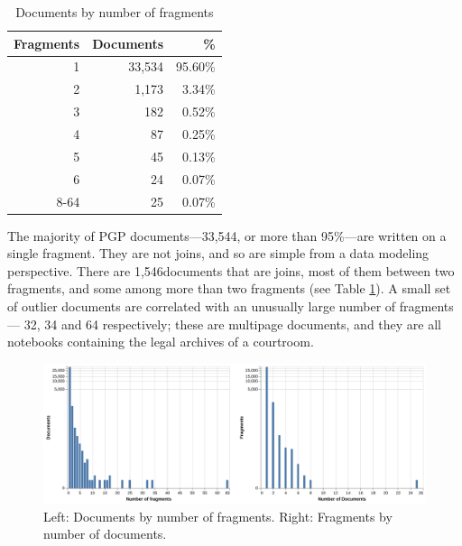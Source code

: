 \documentclass{article}
\def\singleFragmentDocuments{33,544}
\def\totalJoins{1,546}
\begin{document}
\begin{table}
\begin{center}
\caption{Documents by number of fragments}
\label{table:docs_per_numfrags}
\begin{tabular}{rrr}
\toprule
{Fragments} & {Documents} & {\%}\\
\midrule
1 & 33,534 & 95.60\% \\
2 & 1,173 & 3.34\% \\
3 & 182 & 0.52\% \\
4 & 87 & 0.25\% \\
5 & 45 & 0.13\% \\
6 & 24 & 0.07\% \\
8-64 & 25 & 0.07\% \\
\bottomrule
\end{tabular}
\end{center}
\end{table}

The majority of PGP documents—\singleFragmentDocuments, or more than 95\%—are written on a single fragment. They are not joins, and so are simple from a data modeling perspective. There are \totalJoins documents that are joins, most of them between two fragments, and some among more than two fragments (see Table \ref{table:docs_per_numfrags}). A small set of outlier documents are correlated with an unusually large number of fragments — 32, 34 and 64 respectively; these are multipage documents, and they are all notebooks containing the legal archives of a courtroom.


\begin{figure}[!hbt]
  \includegraphics[width=1.0\linewidth]{charts/docs_frags_2up.pdf}
  \centering
  \caption{Left: Documents by number of fragments. Right: Fragments by number of documents.}
  \label{fig:docs_per_num_frags}
\end{figure}

\end{document}
